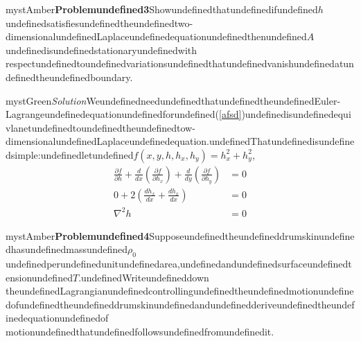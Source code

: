 \begin{mystadmonition}{mystAmber}{\textbf{Problemundefined3}}Showundefinedthatundefinedifundefined$h$undefinedsatisfiesundefinedtheundefinedtwo-dimensionalundefinedLaplaceundefinedequationundefinedthenundefined$A$undefinedisundefinedstationaryundefinedwith
respectundefinedtoundefinedvariationsundefinedthatundefinedvanishundefinedatundefinedtheundefinedboundary.

\end{mystadmonition}
\begin{mystadmonition}{mystGreen}{\emph{Solution}}WeundefinedneedundefinedthatundefinedtheundefinedEuler-Lagrangeundefinedequationundefinedforundefined(\ref{afsd})undefinedisundefinedequivlanetundefinedtoundefinedtheundefinedtow-dimensionalundefinedLaplaceundefinedequation.undefinedThatundefinedisundefinedsimple:undefinedletundefined$f(x,y,h, h_x,h_y)=h_x^2 + h_y^2$,
\begin{equation}
\begin{aligned}
\frac{\partial f}{\partial h} + \frac{d}{dx}\left(\frac{\partial f}{\partial h_x}\right) + \frac{d}{dy}\left(\frac{\partial f}{\partial h_y}\right) &= 0 \\
 0 + 2\left(\frac{dh_x}{dx} +  \frac{dh_x}{dx}\right) &= 0\\
 \nabla^2 h &=0
\end{aligned}
\end{equation}

\end{mystadmonition}
\begin{mystadmonition}{mystAmber}{\textbf{Problemundefined4}}Supposeundefinedtheundefineddrumskinundefinedhasundefinedmassundefined$\rho_0$undefinedperundefinedunitundefinedarea,undefinedandundefinedsurfaceundefinedtensionundefined$T$.undefinedWriteundefineddown
theundefinedLagrangianundefinedcontrollingundefinedtheundefinedmotionundefinedofundefinedtheundefineddrumskinundefinedandundefinedderiveundefinedtheundefinedequationundefinedof
motionundefinedthatundefinedfollowsundefinedfromundefinedit.

\end{mystadmonition}

